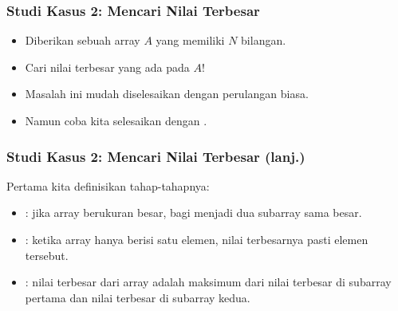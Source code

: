 %  
%    
%    
%

\begin{frame}
\frametitle{Studi Kasus 2: Mencari Nilai Terbesar}
\begin{itemize}
  \item Diberikan sebuah array $A$ yang memiliki $N$ bilangan.
  \item Cari nilai terbesar yang ada pada $A$!\newline
  \item Masalah ini mudah diselesaikan dengan perulangan biasa.
  \item Namun coba kita selesaikan dengan .\end{itemize}
\end{frame}

\begin{frame}
\frametitle{Studi Kasus 2: Mencari Nilai Terbesar (lanj.)}
Pertama kita definisikan tahap-tahapnya:
\begin{itemize}
  \item {}: jika array berukuran besar, bagi menjadi dua subarray sama besar.
  \item {}: ketika array hanya berisi satu elemen, nilai terbesarnya pasti elemen tersebut.
  \item {}: nilai terbesar dari array adalah maksimum dari nilai terbesar di subarray pertama dan nilai terbesar di subarray kedua.
\end{itemize}
\end{frame}

